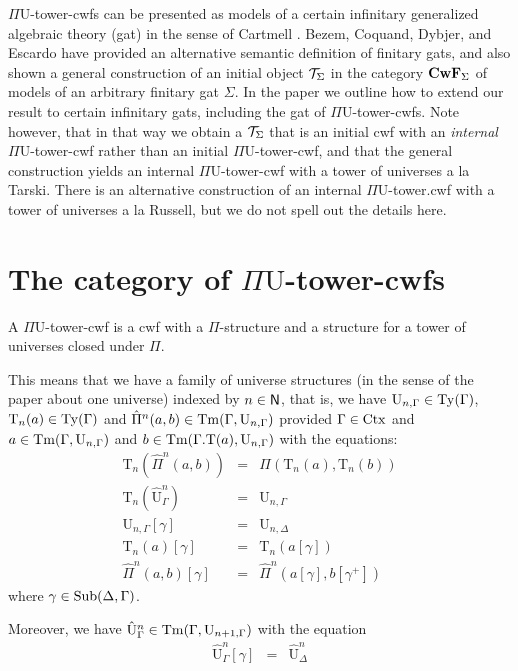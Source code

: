 \documentclass{lmcs}
\def\UU{\mathrm{U}}
\def\Ta{\mathrm{T}}
\def\Pihat{\hat{\Pi}}
\def\UUhat{\hat{\UU}}
\begin{document}
$\Pi\UU$-tower-cwfs can be presented as models of a certain infinitary generalized algebraic theory (gat) in the sense of Cartmell \cite{cartmell:phd}. Bezem, Coquand, Dybjer, and Escardo \cite{bezem:hofmann} have provided an alternative semantic definition of finitary gats, and also shown a general construction of an initial object ${\mathcal T}_\Sigma$ in the category $\textbf{CwF}_\Sigma$ of models of an arbitrary finitary gat $\Sigma$. In the paper we outline how to extend our result to certain infinitary gats, including the gat of $\Pi\UU$-tower-cwfs. Note however, that in that way we obtain a ${\mathcal T}_\Sigma$ that is an initial cwf with an {\em internal} $\Pi\UU$-tower-cwf rather than an initial $\Pi\UU$-tower-cwf, and that the general construction yields an internal $\Pi\UU$-tower-cwf with a tower of universes a la Tarski. There is an alternative construction of an internal $\Pi\UU$-tower.cwf with a tower of universes a la Russell, but we do not spell out the details here.

\section{The category of $\Pi\UU$-tower-cwfs}

 A $\Pi \UU$-tower-cwf is a cwf with a $\Pi$-structure and a structure for a tower of universes closed under $\Pi$.
 
This means that we have a family of universe structures (in the sense of the paper about one universe) indexed by $n \in \mathsf{N}$, that is, we have $\UU_{n,\Gamma} \in \Ty(\Gamma)$, $\Ta_n(a) \in \Ty(\Gamma)$ and $\Pihat^n(a,b) \in \Tm(\Gamma,\UU_{n,\Gamma})$ provided $\Gamma \in \mathrm{Ctx}$ and $a  \in \Tm(\Gamma,\UU_{n,\Gamma})$ and 
$b \in \Tm(\Gamma . \Ta(a),\UU_{n,\Gamma})$ with the equations:
\begin{eqnarray*}
\Ta_n(\Pihat^n(a,b)) &= &\Pi(\Ta_n(a),\Ta_n(b))\\
\Ta_n(\UUhat^n_{\Gamma}) &= &\UU_{n,\Gamma}\\
\UU_{n,\Gamma}[\gamma] &=& \UU_{n,\Delta}\\
\Ta_n(a)[\gamma] &=& \Ta_n(a[\gamma])\\
\Pihat^n(a,b)[\gamma] &=& \Pihat^n(a[\gamma],b[\gamma^+])
\end{eqnarray*}
where $\gamma \in \mathrm{Sub}(\Delta,\Gamma)$.

Moreover, we have $\UUhat^n_{\Gamma} \in \Tm(\Gamma,\UU_{n+1,\Gamma})$ with the equation
\begin{eqnarray*}
\UUhat^n_\Gamma[\gamma] &=& \UUhat^n_\Delta
\end{eqnarray*}
\end{document}
